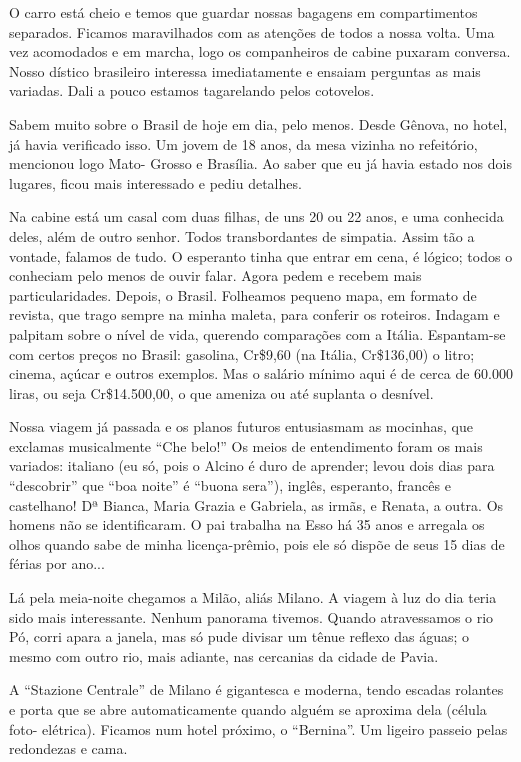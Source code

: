 O carro está cheio e temos que guardar nossas bagagens em compartimentos separados. Ficamos maravilhados com as atenções de todos a nossa volta. Uma vez acomodados e em marcha, logo os companheiros de cabine puxaram conversa. Nosso dístico brasileiro interessa imediatamente e ensaiam perguntas as mais variadas. Dali a pouco estamos tagarelando pelos cotovelos.

Sabem muito sobre o Brasil de hoje em dia, pelo menos. Desde Gênova, no hotel, já havia verificado isso. Um jovem de 18 anos, da mesa vizinha no refeitório, mencionou logo Mato- Grosso e Brasília. Ao saber que eu já havia estado nos dois lugares, ficou mais interessado e pediu detalhes.

Na cabine está um casal com duas filhas, de uns 20 ou 22 anos, e uma conhecida deles, além de outro senhor. Todos transbordantes de simpatia. Assim tão a vontade, falamos de tudo. O esperanto tinha que entrar em cena, é lógico; todos o conheciam pelo menos de ouvir falar. Agora pedem e recebem mais particularidades. Depois, o Brasil. Folheamos pequeno mapa, em formato de revista, que trago sempre na minha maleta, para conferir os roteiros. Indagam e palpitam sobre o nível de vida, querendo comparações com a Itália. Espantam-se com certos preços no Brasil: gasolina, Cr\$9,60 (na Itália, Cr\$136,00) o litro; cinema, açúcar e outros exemplos. Mas o salário mínimo aqui é de cerca de 60.000 liras, ou seja Cr\$14.500,00, o que ameniza ou até suplanta o desnível.

Nossa viagem já passada e os planos futuros entusiasmam as mocinhas, que exclamas musicalmente “Che belo!” Os meios de entendimento foram os mais variados: italiano (eu só, pois o Alcino é duro de aprender; levou dois dias para “descobrir” que “boa noite” é “buona sera”), inglês, esperanto, francês e castelhano! Dª Bianca, Maria Grazia e Gabriela, as irmãs, e Renata, a outra. Os homens não se identificaram. O pai trabalha na Esso há 35 anos e arregala os olhos quando sabe de minha licença-prêmio, pois ele só dispõe de seus 15 dias de férias por ano...

Lá pela meia-noite chegamos a Milão, aliás Milano. A viagem à luz do dia teria sido mais interessante. Nenhum panorama tivemos. Quando atravessamos o rio Pó, corri apara a janela, mas só pude divisar um tênue reflexo das águas; o mesmo com outro rio, mais adiante, nas cercanias da cidade de Pavia.

A “Stazione Centrale” de Milano é gigantesca e moderna, tendo escadas rolantes e porta que se abre automaticamente quando alguém se aproxima dela (célula foto- elétrica). Ficamos num hotel próximo, o “Bernina”. Um ligeiro passeio pelas redondezas e cama.

